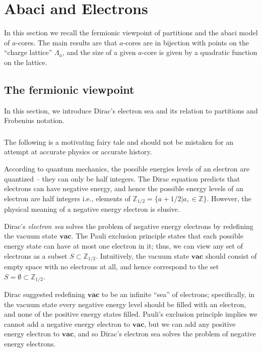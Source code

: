 \documentclass{amsart}[12pt]
\theoremstyle{definition}
\newtheorem{definition}[dummy]{Definition}
\newcommand{\Z}{\mathbb{Z}}
\newcommand{\R}{\mathbb{R}}
\newcommand{\vac}{\mathbf{vac}}
\begin{document}
\section{Abaci and Electrons}

In this section we recall the fermionic viewpoint of partitions and the abaci model of $a$-cores.  The main results are that $a$-cores are in bijection with points on the ``charge lattice'' $\Lambda_a$, and the size of a given $a$-core is given by a quadratic function on the lattice.



\subsection{The fermionic viewpoint}
In this section, we introduce Dirac's electron sea and its relation to partitions and Frobenius notation.

\subsubsection{} The following is a motivating fairy tale and should not be mistaken for an attempt at accurate physics or accurate history.


According to quantum mechanics, the possible energies levels of an electron are quantized -- they can only be half integers.  The Dirac equation predicts that electrons can have negative energy, and hence the possible energy levels of an electron are half integers i.e., elements of $\Z_{1/2}=\{a+1/2|a,\in\Z\}$.  However, the physical meaning of a negative energy electron is elusive.

Dirac's \emph{electron sea} solves the problem of negative energy electrons by redefining the vacuum state $\vac$.  The Pauli exclusion principle states that each possible energy state can have at most one electron in it; thus, we can view any set of electrons as a subset $S\subset \Z_{1/2}$.  Intuitively, the vacuum state $\vac$ should consist of empty space with no electrons at all, and hence correspond to the set $S=\emptyset\subset\Z_{1/2}$.

Dirac suggested redefining $\vac$ to be an
infinite ``sea'' of electrons; specifically, in the vacuum state every negative energy level should be filled with an electron, and none of the positive energy states filled.   Pauli's
exclusion principle implies we cannot add a negative energy electron
to $\vac$, but we can add any positive energy electron to $\vac$, and so Dirac's electron sea solves the problem of negative energy electrons.
\end{document}
